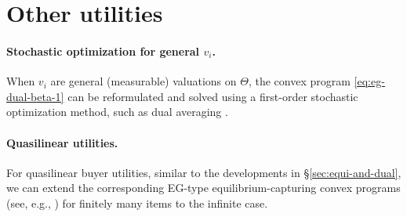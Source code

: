 \section{Other utilities}

\paragraph{Stochastic optimization for general $v_i$.}
When $v_i$ are general (measurable) valuations on $\Theta$, the convex program \eqref{eq:eg-dual-beta-1} can be reformulated and solved using a first-order stochastic optimization method, such as dual averaging \citep{nesterov2009primal,xiao2010dual}. 

\paragraph{Quasilinear utilities.}
For quasilinear buyer utilities, similar to the developments in \S\ref{sec:equi-and-dual}, we can extend the corresponding EG-type equilibrium-capturing convex programs (see, e.g., \cite[\S Lemma 3]{cole2017convex}) for finitely many items to the infinite case.